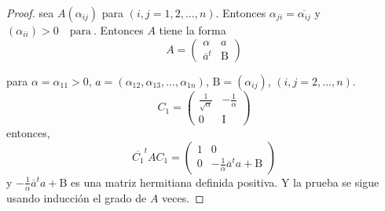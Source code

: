 \documentclass[12pt]{book}
\theoremstyle{definition}
\newcounter{in}
\newcounter{ini}
\begin{document}
\begin{proof}
  sea $A\left(\alpha_{ij}\right)$ para
  $\left(i,j=1,2,...,n\right)$. Entonces
  $\alpha_{ji}=\overline{\alpha_{ij}}$ y
  $\left(\alpha_{ii}\right)>0 \quad \mathrm{para\ }$. Entonces $A$
  tiene la forma
  \begin{equation}
    \label{eq:2}
     A=
     \begin{pmatrix}
    \alpha & a \\ 
    \overline{a}^{t} & \mathrm{B}
  \end{pmatrix}
  \end{equation} 

para $\alpha=\alpha_{11}>0$,
$ a= \left(\alpha_{12},\alpha_{13},...,\alpha_{1n} \right) $,
$ \mathrm{B}=\left(\alpha_{ij}\right)$, $ \left(i,j=2,...,n\right) $.
\begin{equation}
  \label{eq:3}
  C_{1}=
  \begin{pmatrix}
    \frac{1}{\sqrt{\alpha}} & -\frac{1}{\alpha} \\ 
    0 & \mathrm{I}
  \end{pmatrix}
\end{equation}
entonces, 
\begin{equation}
   \label{eq:4}
  \overline{C_{1}}^{t}AC_{1} =
  \begin{pmatrix}
    1 & 0 \\ 
    0 & -\frac{1}{\alpha}\overline{a}^{t}a+\mathrm{B}
  \end{pmatrix}
\end{equation}  
y $-\frac{1}{\alpha}\overline{a}^{t}a+\mathrm{B}$ es una matriz
hermitiana definida positiva. Y la prueba se sigue usando inducción el
grado de $A$ veces.
\end{proof}
\end{document}
